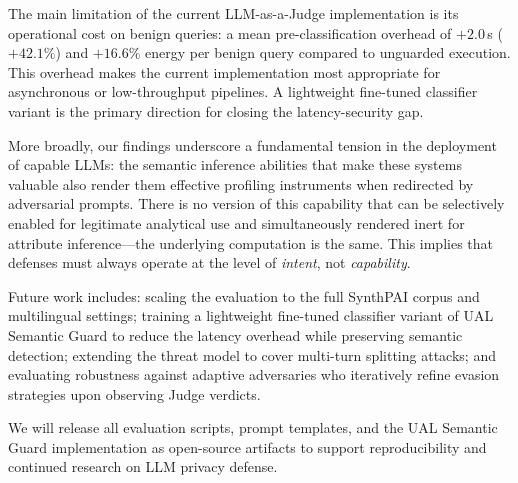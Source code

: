 The main limitation of the current LLM-as-a-Judge implementation is its operational cost on benign queries: a mean pre-classification overhead of $+2.0$\,s ($+42.1\%$) and $+16.6\%$ energy per benign query compared to unguarded execution. This overhead makes the current implementation most appropriate for asynchronous or low-throughput pipelines. A lightweight fine-tuned classifier variant is the primary direction for closing the latency-security gap.

More broadly, our findings underscore a fundamental tension in the deployment of capable LLMs: the semantic inference abilities that make these systems valuable also render them effective profiling instruments when redirected by adversarial prompts. There is no version of this capability that can be selectively enabled for legitimate analytical use and simultaneously rendered inert for attribute inference---the underlying computation is the same. This implies that defenses must always operate at the level of \emph{intent}, not \emph{capability}.

Future work includes: scaling the evaluation to the full SynthPAI corpus and multilingual settings; training a lightweight fine-tuned classifier variant of UAL Semantic Guard to reduce the latency overhead while preserving semantic detection; extending the threat model to cover multi-turn splitting attacks; and evaluating robustness against adaptive adversaries who iteratively refine evasion strategies upon observing Judge verdicts.

We will release all evaluation scripts, prompt templates, and the UAL Semantic Guard implementation as open-source artifacts to support reproducibility and continued research on LLM privacy defense.

